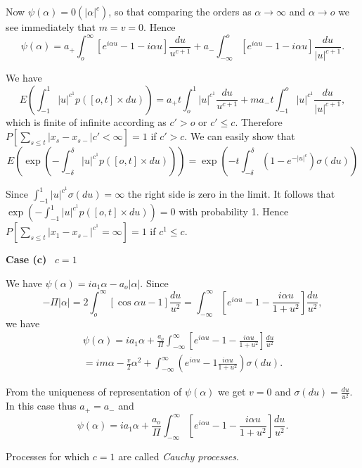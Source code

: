 Now $\psi ( \alpha ) = 0  ( | \alpha  |^c)$, so that comparing the
orders as $\alpha \to \infty$ and $\alpha \to o$ we see immediately
that $m = v =0$. Hence 
$$
\psi ( \alpha ) = a_+ \int_{o}^\infty \left[e^{i \alpha u}- 1-i \alpha u\right]
\frac{du}{u^{c+1}}+  a_- \int_{- \infty}^o \left[e^{i \alpha u}- 1- i
  \alpha u\right] \frac{du}{| u|^{c+1}}. 
$$

We have 
$$
E \left(\int_{-1}^1 | u |^{c^1}p( [o, t] \times du)\right) = a_+ t \int_{o}^1 | u
|^{c^1} \frac{du}{u^{c+1}}+ ma_- t \int_{-1}^o | u |^{c^1} \frac{du}{|
  u |^{c+1}}, 
$$
which is finite of infinite according as $c' >o$ or $c' \le
c$. Therefore $P[\sum\limits_{s \le t} |  x_s - x_{s-}| c' <\infty ]
=1$ if $c' >  c$. We can easily show that  
$$
E\left( \exp\left(-\int_{-\delta}^\delta | u |^{c^1} p([o,t] \times
  du )\right)\right) =
  \exp \left( -t \int_{-\delta}^\delta ( 1 -e^{- | u |^c}) \sigma (du)\right) 
$$

Since $\int_{-1}^1 | u |^{c^1} \sigma (du)= \infty$ the right side is
zero in the limit. It follows that $\exp( - \int_{-1}^1|u |^{c^1} p(
[o, t] \times du)) =0$ with probability 1. Hence\pageoriginale $P[
  \sum_{s \le t} |x_1 - x_{s-}| ^{c^1} = \infty] =1$ if $c^1 \le c$. 

\medskip
\noindent
{\bf Case (c)}~ $c=1$
\smallskip
  
We have $\psi (\alpha ) = i a_1 \alpha - a_o |  \alpha |$. Since 
$$
- \Pi | \alpha | =  2 \int_{o}^\infty [ \cos \alpha u -1]
\frac{du}{u^2}= \int_{-\infty}^\infty [e^{i \alpha u}-1- \frac{i
\alpha u}{1+ u^2}] \frac{du}{u^2}, 
$$
we have 
  \begin{multline*}
  \psi (\alpha )  = i a_1 \alpha + \frac{a_o}{\Pi}
  \int_{-\infty}^\infty \left[e^{i \alpha u}-1- \frac{ i \alpha u}{1+ u^2}\right]
  \frac{du}{u^2}\\
  = im \alpha -  \frac{v}{2}\alpha^2 + \int_{-
    \infty}^\infty \left(e^{i \alpha u}-1 \frac{i  \alpha u}{1+ u^2}\right)
  \sigma (du). 
  \end{multline*}

From the uniqueness of representation of $\psi (\alpha ) $ we get $v =
0$ and $\sigma ( du) = \frac{du}{u^2}$. In this case thus $a_+ = a_ -$
and  
$$
\psi( \alpha ) = i a_1 \alpha + \frac{a_o}{ \Pi} \int_{-\infty}^\infty
    \left[e^{i \alpha  u}-1- \frac{i \alpha u}{1+ u^2}\right] \frac{du}{u^2} . 
$$

\begin{defi*}
  Processes for which $c=1$ are called \textit{Cauchy processes}.
\end{defi*}

